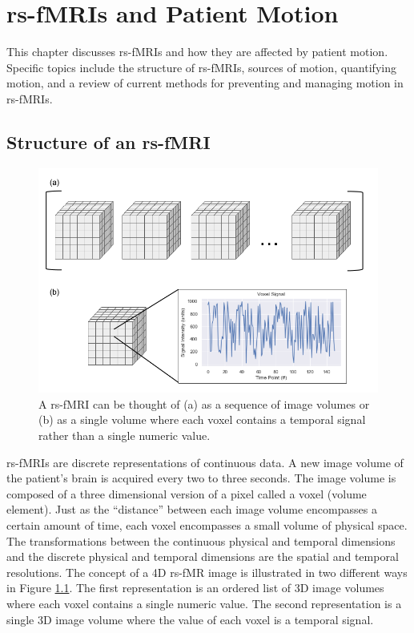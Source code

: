\chapter{rs-fMRIs and Patient Motion}
\label{ch:mri}

This chapter discusses rs-fMRIs and how they are affected by patient motion. Specific topics include the structure of rs-fMRIs, sources of motion, quantifying motion, and a review of current methods for preventing and managing motion in rs-fMRIs.

\section{Structure of an rs-fMRI}

\begin{figure}
\centering
\includegraphics[width=.75\textwidth]{2/rsfMRI-views.png}
\caption{A rs-fMRI can be thought of (a) as a sequence of image volumes or (b) as a single volume where each voxel contains a temporal signal rather than a single numeric value.}
\label{ch2:fig:rsfmri-views}
\end{figure}


rs-fMRIs are discrete representations of continuous data. A new image volume of the patient's brain is acquired every two to three seconds. The image volume is composed of a three dimensional version of a pixel called a voxel (volume element). Just as the ``distance'' between each image volume encompasses a certain amount of time, each voxel encompasses a small volume of physical space. The transformations between the continuous physical and temporal dimensions and the discrete physical and temporal dimensions are the spatial and temporal resolutions. 
The concept of a 4D rs-fMR image is illustrated in two different ways in Figure \ref{ch2:fig:rsfmri-views}. The first representation is an ordered list of 3D image volumes where each voxel contains a single numeric value. The second representation is a single 3D image volume where the value of each voxel is a temporal signal.

